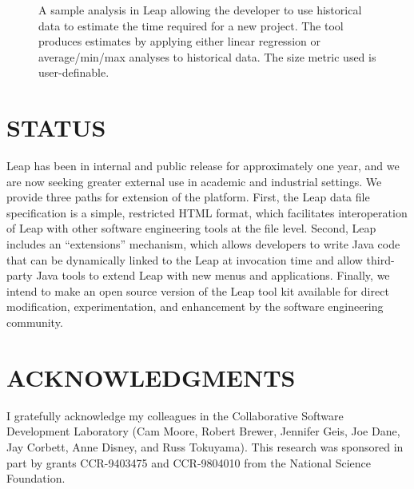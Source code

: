 \begin{figure*} [t]
    {\centerline{}}
    \caption{\label{leap} 
    A sample analysis in Leap allowing the developer to use historical
    data to estimate the time required for a new project. The tool
    produces estimates by applying either linear regression or
    average/min/max analyses to historical data. The size metric used 
    is user-definable. 
   }
\end{figure*}

\section*{STATUS}

Leap has been in internal and public release for approximately one year,
and we are now seeking greater external use in academic and industrial
settings. We provide three paths for extension of the platform. First,
the Leap data file specification is a simple, restricted HTML format,
which facilitates interoperation of Leap with other software 
engineering tools at the file level. Second, Leap includes an
``extensions'' mechanism, which allows developers to write Java 
code that can be dynamically linked to the Leap at invocation time and 
allow third-party Java tools to extend Leap with new menus and 
applications. Finally, we intend to make an open source version of 
the Leap tool kit available for direct modification, experimentation, and
enhancement by the software engineering community.



\section*{ACKNOWLEDGMENTS}

I gratefully acknowledge my colleagues in the Collaborative Software
Development Laboratory (Cam Moore, Robert Brewer, Jennifer Geis, Joe Dane,
Jay Corbett, Anne Disney, and Russ Tokuyama).  This research was sponsored
in part by grants CCR-9403475 and CCR-9804010 from the National Science
Foundation.


 


